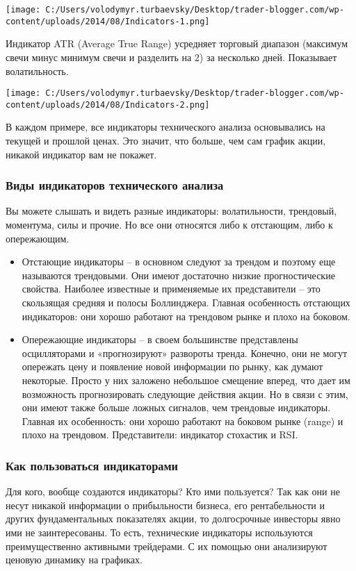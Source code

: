 \documentclass[a5paper]{article}
\begin{document}
\texttt{[image: C:/Users/volodymyr.turbaevsky/Desktop/trader-blogger.com/wp-content/uploads/2014/08/Indicators-1.png]}

Индикатор ATR (Average True Range) усредняет торговый диапазон (максимум свечи минус минимум свечи и разделить на 2) за несколько дней. Показывает волатильность.

\texttt{[image: C:/Users/volodymyr.turbaevsky/Desktop/trader-blogger.com/wp-content/uploads/2014/08/Indicators-2.png]}

В каждом примере, все индикаторы технического анализа основывались на текущей и прошлой ценах. Это значит, что больше, чем сам график акции, никакой индикатор вам не покажет.

\subsubsection{Виды индикаторов технического анализа}

Вы можете слышать и видеть разные индикаторы: волатильности, трендовый, моментума, силы и прочие. Но все они относятся либо к отстающим, либо к опережающим.
\begin{itemize}
\item     Отстающие индикаторы – в основном следуют за трендом и поэтому еще называются трендовыми. Они имеют достаточно низкие прогностические свойства. Наиболее известные и применяемые их представители – это скользящая средняя и полосы Боллинджера. Главная особенность отстающих индикаторов: они хорошо работают на трендовом рынке и плохо на боковом.
\item     Опережающие индикаторы – в своем большинстве представлены осцилляторами и «прогнозируют» развороты тренда. Конечно, они не могут опережать цену и появление новой информации по рынку, как думают некоторые. Просто у них заложено небольшое смещение вперед, что дает им возможность прогнозировать следующие действия акции. Но в связи с этим, они имеют также больше ложных сигналов, чем трендовые индикаторы. Главная их особенность: они хорошо работают на боковом рынке (range) и плохо на трендовом. Представители: индикатор стохастик и RSI.
\end{itemize}

\subsubsection{Как пользоваться индикаторами}

Для кого, вообще создаются индикаторы? Кто ими пользуется? Так как они не несут никакой информации о прибыльности бизнеса, его рентабельности и других фундаментальных показателях акции, то долгосрочные инвесторы явно ими не заинтересованы. То есть, технические индикаторы используются преимущественно активными трейдерами. С их помощью они анализируют ценовую динамику на графиках.
\end{document}

